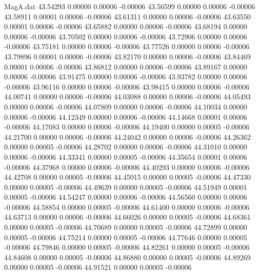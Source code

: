 \begin{filecontents}{MagA.dat}
  43.54293    0.00000    0.00006   -0.00006
  43.56599    0.00000    0.00006   -0.00006
  43.58911    0.00001    0.00006   -0.00006
  43.61311    0.00000    0.00006   -0.00006
  43.63550    0.00001    0.00006   -0.00006
  43.65882    0.00000    0.00006   -0.00006
  43.68194    0.00000    0.00006   -0.00006
  43.70502    0.00000    0.00006   -0.00006
  43.72906    0.00000    0.00006   -0.00006
  43.75181    0.00000    0.00006   -0.00006
  43.77526    0.00000    0.00006   -0.00006
  43.79896    0.00001    0.00006   -0.00006
  43.82170    0.00000    0.00006   -0.00006
  43.84469    0.00001    0.00006   -0.00006
  43.86812    0.00000    0.00006   -0.00006
  43.89167    0.00000    0.00006   -0.00006
  43.91475    0.00000    0.00006   -0.00006
  43.93782    0.00000    0.00006   -0.00006
  43.96116    0.00000    0.00006   -0.00006
  43.98415    0.00000    0.00006   -0.00006
  44.00741    0.00000    0.00006   -0.00006
  44.03088    0.00000    0.00006   -0.00006
  44.05493    0.00000    0.00006   -0.00006
  44.07809    0.00000    0.00006   -0.00006
  44.10034    0.00000    0.00006   -0.00006
  44.12349    0.00000    0.00006   -0.00006
  44.14668    0.00001    0.00006   -0.00006
  44.17083    0.00000    0.00006   -0.00006
  44.19400    0.00000    0.00005   -0.00006
  44.21700    0.00000    0.00006   -0.00006
  44.24042    0.00000    0.00006   -0.00006
  44.26362    0.00000    0.00005   -0.00006
  44.28702    0.00000    0.00006   -0.00006
  44.31010    0.00000    0.00006   -0.00006
  44.33341    0.00000    0.00005   -0.00006
  44.35654    0.00001    0.00006   -0.00006
  44.37968    0.00000    0.00006   -0.00006
  44.40293    0.00000    0.00006   -0.00006
  44.42708    0.00000    0.00005   -0.00006
  44.45015    0.00000    0.00005   -0.00006
  44.47330    0.00000    0.00005   -0.00006
  44.49639    0.00000    0.00005   -0.00006
  44.51949    0.00001    0.00005   -0.00006
  44.54247    0.00000    0.00006   -0.00006
  44.56560    0.00000    0.00006   -0.00006
  44.58854    0.00000    0.00005   -0.00006
  44.61400    0.00000    0.00006   -0.00006
  44.63713    0.00000    0.00006   -0.00006
  44.66026    0.00000    0.00005   -0.00006
  44.68361    0.00000    0.00005   -0.00006
  44.70689    0.00000    0.00005   -0.00006
  44.72899    0.00000    0.00005   -0.00006
  44.75214    0.00000    0.00005   -0.00006
  44.77646    0.00000    0.00005   -0.00006
  44.79846    0.00000    0.00005   -0.00006
  44.82261    0.00000    0.00005   -0.00006
  44.84608    0.00000    0.00005   -0.00006
  44.86880    0.00000    0.00005   -0.00006
  44.89269    0.00000    0.00005   -0.00006
  44.91521    0.00000    0.00005   -0.00006

\end{filecontents}
